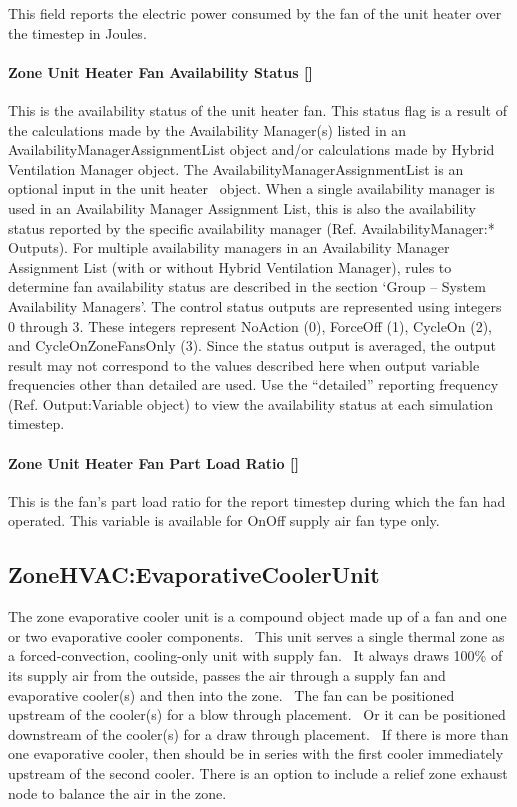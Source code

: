 This field reports the electric power consumed by the fan of the unit heater over the timestep in Joules.

\paragraph{Zone Unit Heater Fan Availability Status {[]}}\label{zone-unit-heater-fan-availability-status}

This is the availability status of the unit heater fan. This status flag is a result of the calculations made by the Availability Manager(s) listed in an AvailabilityManagerAssignmentList object and/or calculations made by Hybrid Ventilation Manager object. The AvailabilityManagerAssignmentList is an optional input in the unit heater~ object. When a single availability manager is used in an Availability Manager Assignment List, this is also the availability status reported by the specific availability manager (Ref. AvailabilityManager:* Outputs). For multiple availability managers in an Availability Manager Assignment List (with or without Hybrid Ventilation Manager), rules to determine fan availability status are described in the section `Group -- System Availability Managers'. The control status outputs are represented using integers 0 through 3. These integers represent NoAction (0), ForceOff (1), CycleOn (2), and CycleOnZoneFansOnly (3). Since the status output is averaged, the output result may not correspond to the values described here when output variable frequencies other than detailed are used. Use the ``detailed'' reporting frequency (Ref. Output:Variable object) to view the availability status at each simulation timestep.

\paragraph{Zone Unit Heater Fan Part Load Ratio {[]}}\label{zone-unit-heater-fan-part-load-ratio}

This is the fan's part load ratio for the report timestep during which the fan had operated. This variable is available for OnOff supply air fan type only.

\subsection{ZoneHVAC:EvaporativeCoolerUnit}\label{zonehvacevaporativecoolerunit}

The zone evaporative cooler unit is a compound object made up of a fan and one or two evaporative cooler components.~ This unit serves a single thermal zone as a forced-convection, cooling-only unit with supply fan.~ It always draws 100\% of its supply air from the outside, passes the air through a supply fan and evaporative cooler(s) and then into the zone.~ The fan can be positioned upstream of the cooler(s) for a blow through placement.~ Or it can be positioned downstream of the cooler(s) for a draw through placement.~ If there is more than one evaporative cooler, then should be in series with the first cooler immediately upstream of the second cooler. There is an option to include a relief zone exhaust node to balance the air in the zone.

